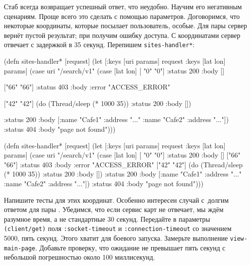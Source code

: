 Стаб всегда возвращает успешный ответ, что неудобно. Научим его негативным
сценариям. Проще всего это сделать с помощью параметров. Договоримся, что
некоторые координаты, которые посылает пользователь, особые. Для пары 
сервер вернёт пустой результат; при  получим ошибку
доступа. С координатами  сервер отвечает с задержкой в 35
секунд. Перепишем \verb|sites-handler*|:

\ifx\DEVICETYPE\MOBILE

\begin{english}
  \begin{clojure}
(defn sites-handler* [request]
  (let [{:keys [uri params]} request
        {:keys [lat lon]} params]
    (case uri
      "/search/v1"
      (case [lat lon]
        [ "0"  "0"]
        {:status 200 :body []}

        ["66" "66"]
        {:status 403
         :body {:error "ACCESS_ERROR"}}

        ["42" "42"]
        (do (Thread/sleep (* 1000 35))
            {:status 200 :body []})

        {:status 200
         :body [{:name "Cafe1"
                 :address "..."}
                {:name "Cafe2"
                 :address "..."}]})
      {:status 404
       :body "page not found"})))
  \end{clojure}
\end{english}

\else

\begin{english}
  \begin{clojure}
(defn sites-handler* [request]
  (let [{:keys [uri params]} request
        {:keys [lat lon]} params]
    (case uri
      "/search/v1"
      (case [lat lon]
        [ "0"  "0"] {:status 200 :body []}
        ["66" "66"] {:status 403 :body {:error "ACCESS_ERROR"}}
        ["42" "42"] (do (Thread/sleep (* 1000 35))
                        {:status 200 :body []})
        {:status 200
         :body [{:name "Cafe1" :address "..."}
                {:name "Cafe2" :address "..."}]})
      {:status 404 :body "page not found"})))
  \end{clojure}
\end{english}

\fi


Напишите тесты для этих координат. Особенно интересен случай с~долгим ответом
для пары . Убедимся, что если сервис карт не отвечает, мы ждём
разумное время, а не стандартные 30 секунд. Передайте в параметры
\verb|(client/get)| поля \verb|:socket-timeout| и \verb|:connection-timeout| со
значением 5000, пять секунд. Этого хватит для боевого запуска. Замерьте
выполнение \verb|view-main-page|. Добавьте проверку, что ожидание не превышает
пять секунд с небольшой погрешностью около 100 миллисекунд.

